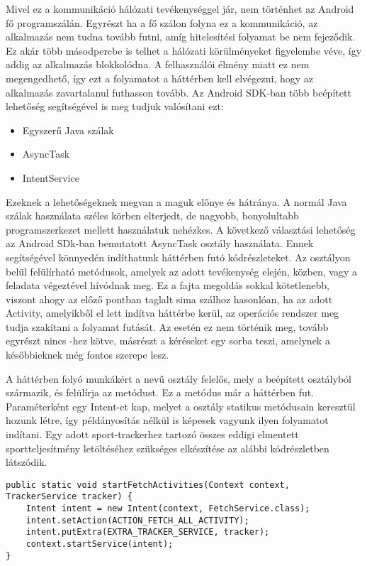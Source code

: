 Mivel ez a kommunikáció hálózati tevékenységgel jár, nem történhet az Android fő programszálán. 
Egyrészt ha a fő szálon folyna ez a kommunikáció, az alkalmazás nem tudna tovább futni, amíg hitelesítési folyamat be nem fejeződik. 
Ez akár több másodpercbe is telhet a hálózati körülményeket figyelembe véve, így addig az alkalmazás blokkolódna. 
A felhasználói élmény miatt ez nem megengedhető, így ezt a folyamatot a háttérben kell elvégezni, hogy az alkalmazás zavartalanul futhasson tovább. 
Az Android SDK-ban több beépített lehetőség segítségével is meg tudjuk valósítani ezt:

\begin{itemize}
	\item Egyszerű Java szálak 
	\item AsyncTask 
	\item IntentService 
\end{itemize}

Ezeknek a lehetőségeknek megvan a maguk előnye és hátránya. 
A normál Java szálak használata széles körben elterjedt, de nagyobb, bonyolultabb programszerkezet mellett használatuk nehézkes. 
A következő választási lehetőség az Android SDk-ban bemutatott AsyncTask osztály használata. 
Ennek segítségével könnyedén indíthatunk háttérben futó kódrészleteket. 
Az osztályon belül felülírható metódusok, amelyek az adott tevékenység elején, közben, vagy a feladata végeztével hívódnak meg. 
Ez a fajta megoldás sokkal kötetlenebb, viszont ahogy az előző pontban taglalt sima szálhoz hasonlóan, ha az adott Activity, amelyikből el lett indítva háttérbe kerül, az operációs rendszer meg tudja szakítani a folyamat futását. 
Az  esetén ez nem történik meg, tovább egyrészt nincs -hez kötve, másrészt a kéréseket egy sorba teszi, amelynek a későbbieknek még fontos szerepe lesz. 

A háttérben folyó munkákért a  nevű osztály felelős, mely a beépített  osztályból származik, és felülírja az  metódust. 
Ez a metódus már a háttérben fut. Paraméterként egy Intent-et kap, melyet a  osztály statikus metódusain keresztül hozunk létre, így példányosítás nélkül is képesek vagyunk ilyen folyamatot indítani. 
Egy adott sport-trackerhez tartozó összes eddigi elmentett sportteljesítmény letöltéséhez szükséges  elkészítése az alábbi kódrészletben látszódik. 

\begin{lstlisting}
public static void startFetchActivities(Context context, TrackerService tracker) {
    Intent intent = new Intent(context, FetchService.class);
    intent.setAction(ACTION_FETCH_ALL_ACTIVITY);
    intent.putExtra(EXTRA_TRACKER_SERVICE, tracker);
    context.startService(intent);
}
\end{lstlisting}


